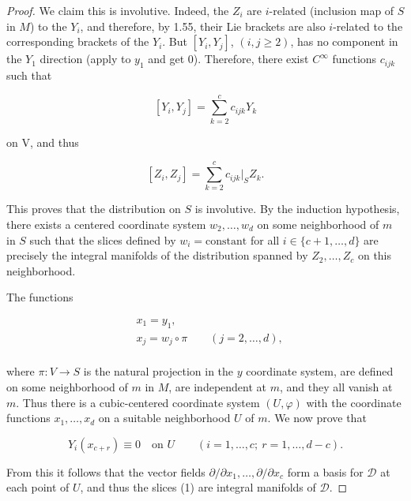 \begin{proof}
	We claim this is involutive. Indeed, the $Z_{i}$ are $i$-related (inclusion map of $S$ in $M$) to the $Y_{i}$, and therefore, by 1.55, their Lie brackets are also $i$-related to the corresponding brackets of the $Y_{i}$. But $[Y_{i}, Y_{j}]$, $(i, j \geq 2)$, has no component in the $Y_{1}$ direction (apply to $y_{1}$ and get 0). Therefore, there exist $C^{\infty}$ functions $c_{ijk}$ such that

	\begin{equation}
		\tag{6}\label{eq:1.60:6}
		[Y_{i},Y_{j}]=\sum_{k=2}^{c}c_{i j k}Y_{k}
	\end{equation}

	on V, and thus

	\begin{equation}
		\tag{7}\label{eq:1.60:7}
		[Z_{i},Z_{j}]=\sum_{k=2}^{c}c_{i j k}\bigg|_{S}Z_{k}.
	\end{equation}

	This proves that the distribution on $S$ is involutive. By the induction hypothesis, there exists a centered coordinate system $w_{2}, \ldots, w_{d}$ on some neighborhood of $m$ in $S$ such that the slices defined by $w_{i} = \mathrm{constant}$ for all $i \in \{c+1, \ldots, d\}$ are precisely the integral manifolds of the distribution spanned by $Z_{2}, \ldots, Z_{c}$ on this neighborhood.

	The functions

	\begin{equation}
		\tag{8}\label{eq:1.60:8}
		\begin{aligned}{}&{{}x_{1}=y_{1},}\\ {}&{{}x_{j}=w_{j}\circ\pi\qquad(j=2,\ldots,d),}\\ \end{aligned}
	\end{equation}

	where $\pi: V \to S$ is the natural projection in the $y$ coordinate system, are defined on some neighborhood of $m$ in $M$, are independent at $m$, and they all vanish at $m$. Thus there is a cubic-centered coordinate system $(U,\varphi)$ with the coordinate functions $x_{1},\ldots,x_{d}$ on a suitable neighborhood $U$ of $m$. We now prove that

	\begin{equation}
		\tag{9}\label{eq:1.60:9}
		Y_{i}(x_{c+r})\equiv0\quad\text{on }U\qquad(i=1,\ldots,c;\ r=1,\ldots,d-c).
	\end{equation}

	From this it follows that the vector fields $\partial/\partial x_{1},\ldots,\partial/\partial x_{c}$ form a basis for $\mathcal{D}$ at each point of $U$, and thus the slices (1) are integral manifolds of $\mathcal{D}$.


\end{proof}
